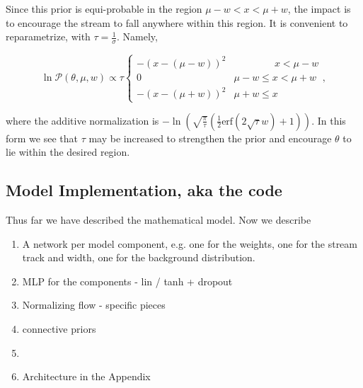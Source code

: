 \documentclass[twocolumn]{aastex631}
\newcommand{\mcal}[1]{\mathcal{#1}}
\newcommand{\pdf}{\mcal{P}}
\begin{document}
            Since this prior is equi-probable in the region $\mu - w < x < \mu + w$, the impact is to encourage the stream to fall anywhere within this region. 
            It is convenient to reparametrize, with $\tau = \frac{1}{\sigma}$. Namely,
            \begin{small}
            \begin{equation}
                \ln \pdf(\theta,\mu,w) \propto \tau \begin{cases} 
                    -\left(x-(\mu-w)\right)^2 & \phantom{\mu - w <}\ x < \mu - w \\
                    0 & \mu - w \leq x < \mu + w \\
                    -\left(x-(\mu+w)\right)^2 & \mu + w \leq x
                \end{cases},
            \end{equation}\end{small}
            where the additive normalization is 
            $-\ln\left(\sqrt{\frac{\pi}{\tau}} \left(\frac{1}{2}\text{erf}\left(2 \sqrt{\tau } w\right)+1\right)\right)$. In this form we see that $\tau$ may be increased to strengthen the prior and encourage $\theta$ to lie within
            the desired region.

    \subsection{Model Implementation, aka the code} \label{sub:model_implementation}

        Thus far we have described the mathematical model.
        Now we describe 


        \begin{enumerate}
            \item A network per model component, e.g. one for the weights, one for the stream track and width, one for the background distribution.
            \item MLP for the components - lin / tanh + dropout
            \item Normalizing flow - specific pieces
            \item connective priors
            \item 
            \item Architecture in the Appendix
        \end{enumerate}
\end{document}
